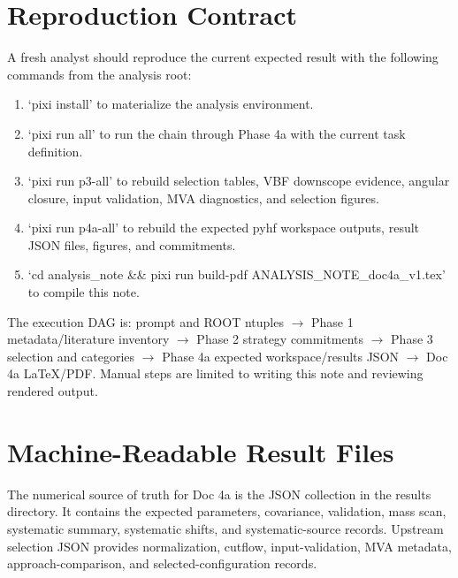 \documentclass[11pt]{article}
\begin{document}
\section{Reproduction Contract}
A fresh analyst should reproduce the current expected result with the following commands from the analysis root:
\begin{enumerate}[leftmargin=*]
\item `pixi install' to materialize the analysis environment.
\item `pixi run all' to run the chain through Phase 4a with the current task definition.
\item `pixi run p3-all' to rebuild selection tables, VBF downscope evidence, angular closure, input validation, MVA diagnostics, and selection figures.
\item `pixi run p4a-all' to rebuild the expected pyhf workspace outputs, result JSON files, figures, and commitments.
\item `cd analysis\_note \&\& pixi run build-pdf ANALYSIS\_NOTE\_doc4a\_v1.tex' to compile this note.
\end{enumerate}
The execution DAG is: prompt and ROOT ntuples $\rightarrow$ Phase 1 metadata/literature inventory $\rightarrow$ Phase 2 strategy commitments $\rightarrow$ Phase 3 selection and categories $\rightarrow$ Phase 4a expected workspace/results JSON $\rightarrow$ Doc 4a LaTeX/PDF. Manual steps are limited to writing this note and reviewing rendered output.
\section{Machine-Readable Result Files}
The numerical source of truth for Doc 4a is the JSON collection in the results directory. It contains the expected parameters, covariance, validation, mass scan, systematic summary, systematic shifts, and systematic-source records. Upstream selection JSON provides normalization, cutflow, input-validation, MVA metadata, approach-comparison, and selected-configuration records.
\clearpage


\end{document}
